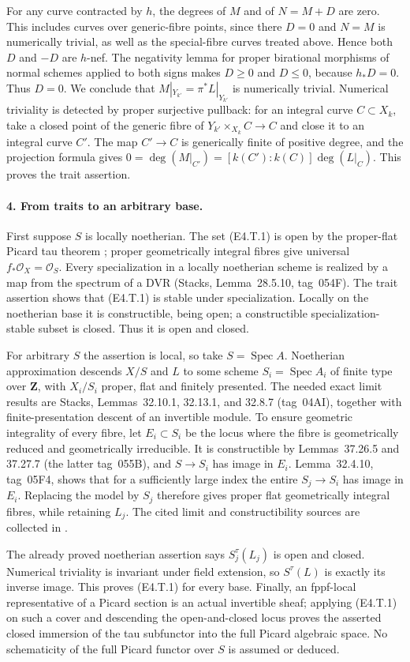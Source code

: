 For any curve contracted by $h$, the degrees of $M$ and of $N=M+D$ are
zero. This includes curves over generic-fibre points, since there $D=0$
and $N=M$ is numerically trivial, as well as the special-fibre curves
treated above. Hence both $D$ and $-D$ are $h$-nef. The negativity lemma for proper
birational morphisms of normal schemes
\cite[Lemma~11.60, p.~436]{KollarFamilies} applied to both signs makes
$D\geq0$ and $D\leq0$, because $h_*D=0$. Thus $D=0$.
We conclude that $M|_{Y_{k'}}=\pi^*L|_{Y_{k'}}$ is numerically trivial.
Numerical triviality is detected by proper surjective pullback: for an
integral curve $C\subset X_k$, take a closed point of the generic fibre
of $Y_{k'}\times_{X_k}C\to C$ and close it to an integral curve $C'$.
The map $C'\to C$ is generically finite of positive degree, and the
projection formula gives
$0=\deg(M|_{C'})=[k(C'):k(C)]\deg(L|_C)$.
This proves the trait assertion.

\paragraph{4. From traits to an arbitrary base.}
First suppose $S$ is locally noetherian. The set (E4.T.1) is open by
the proper-flat Picard tau theorem
\cite[Theorem~2.1]{LaurentSchroer2024}; proper geometrically integral
fibres give universal $f_*\mathcal O_X=\mathcal O_S$.
Every specialization in a locally noetherian scheme is realized by a
map from the spectrum of a DVR (Stacks, Lemma~28.5.10, tag~054F).
The trait assertion shows that (E4.T.1) is stable under specialization.
Locally on the noetherian base it is constructible, being open; a
constructible specialization-stable subset is closed. Thus it is open
and closed.

For arbitrary $S$ the assertion is local, so take $S=\operatorname{Spec}A$.
Noetherian approximation descends $X/S$ and $L$ to some scheme
$S_i=\operatorname{Spec}A_i$ of finite type over $\mathbf Z$, with $X_i/S_i$
proper, flat and finitely presented. The needed exact limit results are
Stacks, Lemmas~32.10.1, 32.13.1, and 32.8.7 (tag~04AI), together with
finite-presentation descent of an invertible module. To ensure geometric
integrality of every fibre, let $E_i\subset S_i$ be the locus where the
fibre is geometrically reduced and geometrically irreducible. It is
constructible by Lemmas~37.26.5 and 37.27.7 (the latter tag~055B), and
$S\to S_i$ has image in $E_i$. Lemma~32.4.10, tag~05F4, shows that for
a sufficiently large index the entire $S_j\to S_i$ has image in $E_i$.
Replacing the model by $S_j$ therefore gives proper flat geometrically
integral fibres, while retaining $L_j$.
The cited limit and constructibility sources are collected in
\cite{BCEStacksTauDescent}.

The already proved noetherian assertion says $S_j^\tau(L_j)$ is open and
closed. Numerical triviality is invariant under field extension, so
$S^\tau(L)$ is exactly its inverse image. This proves (E4.T.1) for every
base. Finally, an fppf-local representative of a Picard section is an
actual invertible sheaf; applying (E4.T.1) on such a cover and descending
the open-and-closed locus proves the asserted closed immersion of the
tau subfunctor into the full Picard algebraic space. No schematicity
of the full Picard functor over $S$ is assumed or deduced.

